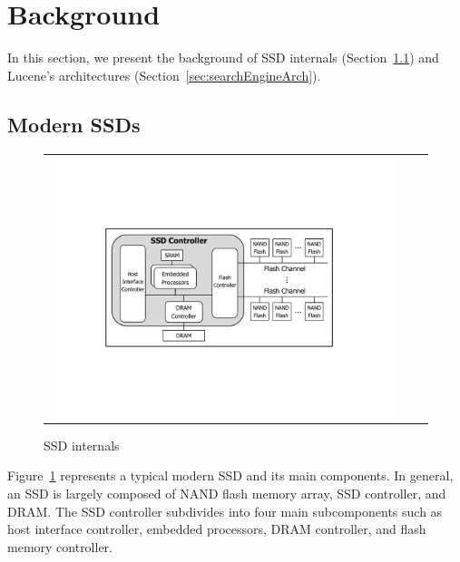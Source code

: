 

\section{Background}\label{sec:background}

In this section, we present the background of SSD internals (Section~\ref{sec:SSDInternals}) and Lucene's architectures (Section~\ref{sec:searchEngineArch}).

\subsection{Modern SSDs}\label{sec:SSDInternals}

\begin{figure}[htbp]
  \centering
  \begin{tabular}{ccc}
 \includegraphics[width=0.95\columnwidth]{figures/SSDInternals.pdf}
\end{tabular}
  \caption{SSD internals}
  \label{fig:SSDInternals}
 \end{figure}

Figure~\ref{fig:SSDInternals} represents a typical modern SSD and its main components. In general, an SSD is largely composed of NAND flash memory array, SSD controller, and DRAM. The SSD controller subdivides into four main subcomponents such as host interface controller, embedded processors, DRAM controller, and flash memory controller.

